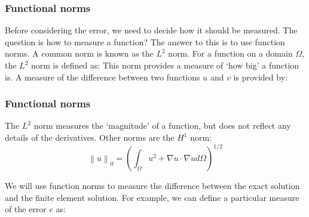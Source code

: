 \documentclass[notes]{beamer}
\begin{document}
\begin{frame}
\frametitle{Functional norms}
Before considering the error, we need to decide how it should be measured. The question
is how to measure a function? The answer to this is to use function norms. A common
norm is known as the $L^2$ norm. For a function on a domain $\Omega$, the $L^2$ norm is defined
as:
This norm provides a measure of ‘how big’ a function is. A measure of the difference
between two functions $u$ and $v$ is provided by:
\end{frame}

\begin{frame}
\frametitle{Functional norms}
The $L^2$ norm measures the `magnitude' of a function, but does not reflect any details of
the derivatives. Other norms are the $H^1$ norm:
	\begin{equation*}
	\left\lVert u \right\rVert_0 = \left(\int_\Omega u^2 + \nabla u \cdot \nabla u d\Omega \right)^{1/2}
	\end{equation*}

We will use function norms to measure the difference between the exact solution and
the finite element solution. For example, we can define a particular measure of the error
$e$ as:


\end{frame}
\end{document}
